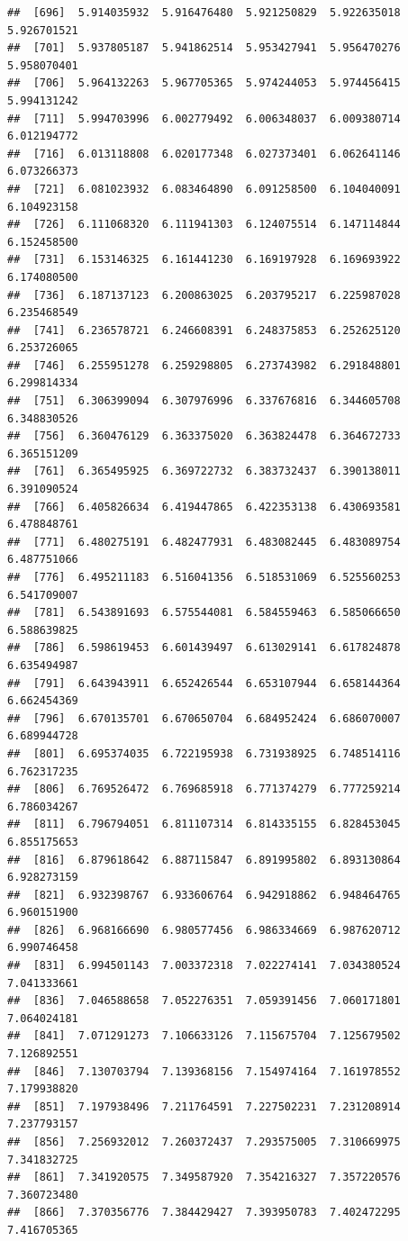 \documentclass[
  11pt]{report}
\begin{document}
\begin{itemize}
\begin{verbatim}
##  [696]  5.914035932  5.916476480  5.921250829  5.922635018  5.926701521
##  [701]  5.937805187  5.941862514  5.953427941  5.956470276  5.958070401
##  [706]  5.964132263  5.967705365  5.974244053  5.974456415  5.994131242
##  [711]  5.994703996  6.002779492  6.006348037  6.009380714  6.012194772
##  [716]  6.013118808  6.020177348  6.027373401  6.062641146  6.073266373
##  [721]  6.081023932  6.083464890  6.091258500  6.104040091  6.104923158
##  [726]  6.111068320  6.111941303  6.124075514  6.147114844  6.152458500
##  [731]  6.153146325  6.161441230  6.169197928  6.169693922  6.174080500
##  [736]  6.187137123  6.200863025  6.203795217  6.225987028  6.235468549
##  [741]  6.236578721  6.246608391  6.248375853  6.252625120  6.253726065
##  [746]  6.255951278  6.259298805  6.273743982  6.291848801  6.299814334
##  [751]  6.306399094  6.307976996  6.337676816  6.344605708  6.348830526
##  [756]  6.360476129  6.363375020  6.363824478  6.364672733  6.365151209
##  [761]  6.365495925  6.369722732  6.383732437  6.390138011  6.391090524
##  [766]  6.405826634  6.419447865  6.422353138  6.430693581  6.478848761
##  [771]  6.480275191  6.482477931  6.483082445  6.483089754  6.487751066
##  [776]  6.495211183  6.516041356  6.518531069  6.525560253  6.541709007
##  [781]  6.543891693  6.575544081  6.584559463  6.585066650  6.588639825
##  [786]  6.598619453  6.601439497  6.613029141  6.617824878  6.635494987
##  [791]  6.643943911  6.652426544  6.653107944  6.658144364  6.662454369
##  [796]  6.670135701  6.670650704  6.684952424  6.686070007  6.689944728
##  [801]  6.695374035  6.722195938  6.731938925  6.748514116  6.762317235
##  [806]  6.769526472  6.769685918  6.771374279  6.777259214  6.786034267
##  [811]  6.796794051  6.811107314  6.814335155  6.828453045  6.855175653
##  [816]  6.879618642  6.887115847  6.891995802  6.893130864  6.928273159
##  [821]  6.932398767  6.933606764  6.942918862  6.948464765  6.960151900
##  [826]  6.968166690  6.980577456  6.986334669  6.987620712  6.990746458
##  [831]  6.994501143  7.003372318  7.022274141  7.034380524  7.041333661
##  [836]  7.046588658  7.052276351  7.059391456  7.060171801  7.064024181
##  [841]  7.071291273  7.106633126  7.115675704  7.125679502  7.126892551
##  [846]  7.130703794  7.139368156  7.154974164  7.161978552  7.179938820
##  [851]  7.197938496  7.211764591  7.227502231  7.231208914  7.237793157
##  [856]  7.256932012  7.260372437  7.293575005  7.310669975  7.341832725
##  [861]  7.341920575  7.349587920  7.354216327  7.357220576  7.360723480
##  [866]  7.370356776  7.384429427  7.393950783  7.402472295  7.416705365

\end{verbatim}
\end{itemize}
\end{document}
